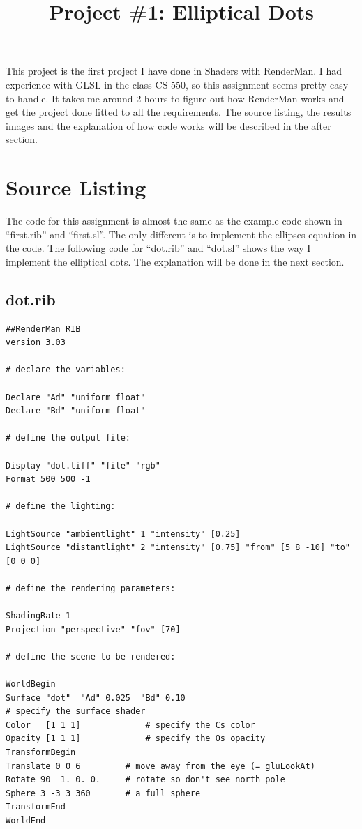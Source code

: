 \documentclass[letterpaper,14pt,titlepage,fleqn]{article}
\author{\name}
\title{Project \#1: Elliptical Dots}
\begin{document}
\maketitle

This project is the first project I have done in Shaders with RenderMan. I had experience with GLSL in the class CS 550, so this assignment seems pretty easy to handle. It takes me around 2 hours to figure out how RenderMan works and get the project done fitted to all the requirements. The source listing, the results images and the explanation of how code works will be described in the after section. 

\section{Source Listing}
The code for this assignment is almost the same as the example code shown in ``first.rib'' and ``first.sl''. The only different is to implement the ellipses equation in the code. The following code for ``dot.rib'' and ``dot.sl'' shows the way I implement the elliptical dots. The explanation will be done in the next section.\\
\subsection{dot.rib}
\begin{lstlisting}
##RenderMan RIB
version 3.03

# declare the variables:

Declare "Ad" "uniform float"
Declare "Bd" "uniform float"

# define the output file:

Display "dot.tiff" "file" "rgb" 
Format 500 500 -1

# define the lighting:

LightSource "ambientlight" 1 "intensity" [0.25]
LightSource "distantlight" 2 "intensity" [0.75] "from" [5 8 -10] "to" [0 0 0]

# define the rendering parameters:

ShadingRate 1
Projection "perspective" "fov" [70]

# define the scene to be rendered:

WorldBegin
Surface "dot"  "Ad" 0.025  "Bd" 0.10
# specify the surface shader
Color   [1 1 1]				# specify the Cs color
Opacity [1 1 1]				# specify the Os opacity
TransformBegin
Translate 0 0 6			# move away from the eye (= gluLookAt)
Rotate 90  1. 0. 0.		# rotate so don't see north pole
Sphere 3 -3 3 360 		# a full sphere
TransformEnd
WorldEnd

\end{lstlisting}
\end{document}
